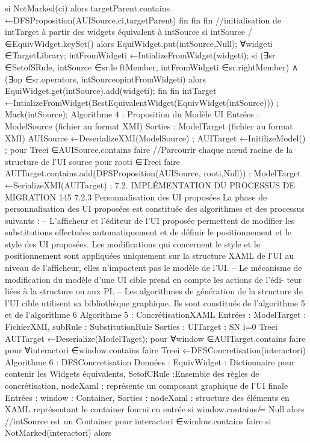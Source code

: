 \documentclass{article}
\begin{document}
si NotMarked(ci) alors
targetParent.contains ←DFSProposition(AUISource,ci,targetParent)
ﬁn
ﬁn
ﬁn
//initialisation de intTarget à partir des widgets équivalent à intSource
si intSource /∈EquivWidget.keySet() alors
EquiWidget.put(intSource,Null);
∀widgeti ∈TargetLibrary;
intFromWidgeti ←IntializeFromWidget(widgeti);
si (∃sr ∈SetofSRule, intSource ∈sr.le ftMember, intFromWidgeti ∈sr.rightMember) ∧
(∃op ∈sr.operators, intSourceopintFromWidgeti) alors
EquiWidget.get(intSource).add(widgeti);
ﬁn
ﬁn
intTarget ←IntializeFromWidget(BestEquivalentWidget(EquivWidget(intSource))) ;
Mark(intSource);
Algorithme 4 : Proposition du Modèle UI
Entrées : ModelSource (ﬁchier au format XMI)
Sorties : ModelTarget (ﬁchier au format XMI)
AUISource ←DeserializeXMI(ModelSource) ;
AUITarget ←InitilizeModel() ;
pour Treei ∈AUISource.contains faire
//Parcourir chaque nœud racine de la structure de l’UI source
pour rooti ∈Treei faire
AUITarget.contains.add(DFSProposition(AUISource, rooti,Null)) ;
ModelTarget ←SerializeXMI(AUITarget) ;
7.2. IMPLÉMENTATION DU PROCESSUS DE MIGRATION
145
7.2.3
Personnalisation des UI proposées
La phase de personnalisation des UI proposées est constituée des algorithmes et des processus
suivants :
– L’afﬁcheur et l’éditeur de l’UI proposée permettent de modiﬁer les substitutions effectuées
automatiquement et de déﬁnir le positionnement et le style des UI proposées. Les modiﬁcations
qui concernent le style et le positionnement sont appliquées uniquement sur la structure XAML
de l’UI au niveau de l’afﬁcheur, elles n’impactent pas le modèle de l’UI.
– Le mécanisme de modiﬁcation du modèle d’une UI cible prend en compte les actions de l’édi-
teur liées à la structure ou aux PI.
– Les algorithmes de génération de la structure de l’UI cible utilisent sa bibliothèque graphique.
Ils sont constitués de l’algorithme 5 et de l’algorithme 6
Algorithme 5 : ConcrétisationXAML
Entrées : ModelTarget : FichierXMI, subRule : SubstitutionRule
Sorties : UITarget : SN
i=0 Treei
AUITarget ←Deserialize(ModelTaget);
pour ∀window ∈AUITarget.contains faire
pour ∀interactori ∈window.contains faire
Treei ←DFSConcretisation(interactori)
Algorithme 6 : DFSConcretisation
Données : EquivWidget : Dictionnaire pour contenir les Widgets équivalents,
SetofCRule :Ensemble des règles de concrétisation, nodeXaml : représente un
composant graphique de l’UI ﬁnale
Entrées : window : Container,
Sorties : nodeXaml : structure des éléments en XAML représentant le container fourni en
entrée
si window.contains ̸= Null alors
//intSource est un Container
pour interactori ∈window.contains faire
si NotMarked(interactori) alors
\end{document}
